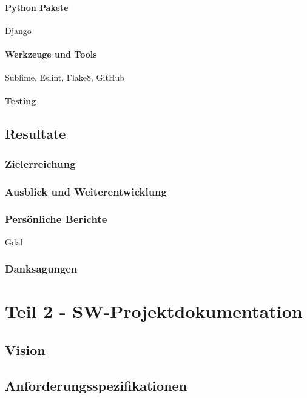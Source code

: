 \subsubsection{Python Pakete}
Django
\subsubsection{Werkzeuge und Tools}
Sublime, Eslint, Flake8, GitHub
\subsubsection{Testing}

\section{Resultate}
\subsection{Zielerreichung}
\subsection{Ausblick und Weiterentwicklung}
\subsection{Pers\"onliche Berichte}
Gdal
\subsection{Danksagungen}
\clearpage
\pagebreak


\chapter{Teil 2 - SW-Projektdokumentation}
\section{Vision}

\section{Anforderungsspezifikationen}
